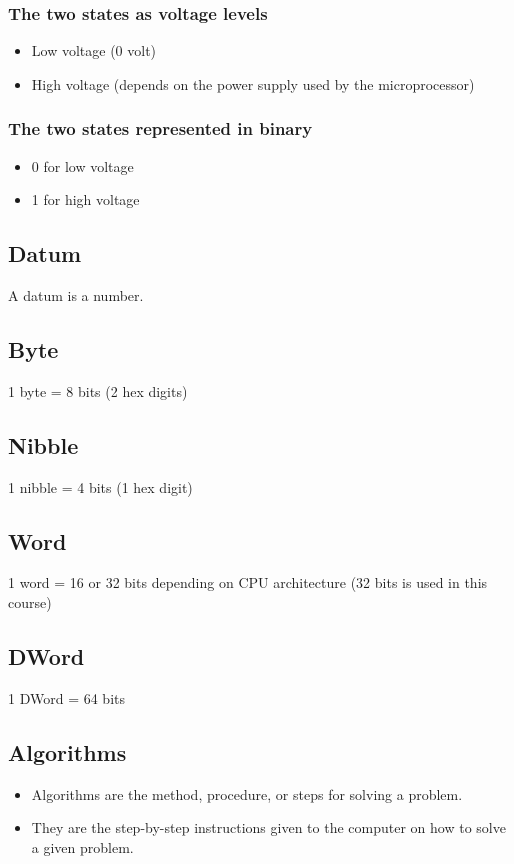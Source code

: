\documentclass[11pt]{article}
\begin{document}
\subsubsection{The two states as voltage levels}
\label{sec:org1572d87}
\begin{itemize}
\item Low voltage (0 volt)
\item High voltage (depends on the power supply used by the microprocessor)
\end{itemize}
\subsubsection{The two states represented in binary}
\label{sec:org7fe03ca}
\begin{itemize}
\item 0 for low voltage
\item 1 for high voltage
\end{itemize}
\subsection{Datum}
\label{sec:org58a9643}
A datum is a number.
\subsection{Byte}
\label{sec:org0ce2b0a}
1 byte = 8 bits (2 hex digits)
\subsection{Nibble}
\label{sec:orge52bf19}
1 nibble = 4 bits (1 hex digit)
\subsection{Word}
\label{sec:org0fa8c3f}
1 word = 16 or 32 bits depending on CPU architecture (32 bits is used in this course)
\subsection{DWord}
\label{sec:orgaa933ca}
1 DWord = 64 bits
\subsection{Algorithms}
\label{sec:orgd2285ea}
\begin{itemize}
\item Algorithms are the method, procedure, or steps for solving a problem.
\item They are the step-by-step instructions given to the computer on how to solve a given problem.
\end{itemize}
\end{document}
